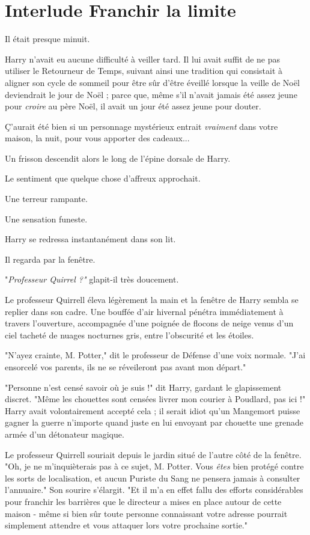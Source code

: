 
\chapter{Interlude   Franchir la limite}

Il était presque minuit.

Harry n'avait eu aucune difficulté à veiller tard. Il lui avait suffit de ne pas utiliser le Retourneur de Temps, suivant ainsi une tradition qui consistait à aligner son cycle de sommeil pour être sûr d'être éveillé lorsque la veille de Noël deviendrait le jour de Noël ; parce que, même s'il n'avait jamais été assez jeune pour \emph{croire}  au père Noël, il avait un jour été assez jeune pour douter.

Ç'aurait été bien si un personnage mystérieux entrait \emph{vraiment}  dans votre maison, la nuit, pour vous apporter des cadeaux...

Un frisson descendit alors le long de l'épine dorsale de Harry.

Le sentiment que quelque chose d'affreux approchait.

Une terreur rampante.

Une sensation funeste.

Harry se redressa instantanément dans son lit.

Il regarda par la fenêtre.

"\emph{Professeur Quirrel ?"}  glapit-il très doucement.

Le professeur Quirrell éleva légèrement la main et la fenêtre de Harry sembla se replier dans son cadre. Une bouffée d'air hivernal pénétra immédiatement à travers l'ouverture, accompagnée d'une poignée de flocons de neige venus d'un ciel tacheté de nuages nocturnes gris, entre l'obscurité et les étoiles.

"N'ayez crainte, M. Potter," dit le professeur de Défense d'une voix normale. "J'ai ensorcelé vos parents, ils ne se réveileront pas avant mon départ."

"Personne n'est censé savoir où je suis !" dit Harry, gardant le glapissement discret. "Même les chouettes sont censées livrer mon courier à Poudlard, pas ici !" Harry avait volontairement accepté cela ; il serait idiot qu'un Mangemort puisse gagner la guerre n'importe quand juste en lui envoyant par chouette une grenade armée d'un détonateur magique.

Le professeur Quirrell souriait depuis le jardin situé de l'autre côté de la fenêtre. "Oh, je ne m'inquièterais pas à ce sujet, M. Potter. Vous \emph{êtes}  bien protégé contre les sorts de localisation, et aucun Puriste du Sang ne pensera jamais à consulter l'annuaire." Son sourire s'élargit. "Et il m'a en effet fallu des efforts considérables pour franchir les barrières que le directeur a mises en place autour de cette maison - même si bien sûr toute personne connaissant votre adresse pourrait simplement attendre et vous attaquer lors votre prochaine sortie."

